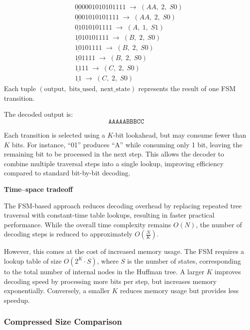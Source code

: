 \[
\begin{aligned}
&\underline{00}0001010101111 \;\rightarrow\; (AA,\;2,\;S0) \\
&\underline{00}01010101111 \;\rightarrow\; (AA,\;2,\;S0) \\
&\underline{01}010101111 \;\rightarrow\; (A,\;1,\;S1) \\
&\underline{10}10101111 \;\rightarrow\; (B,\;2,\;S0) \\
&\underline{10}101111 \;\rightarrow\; (B,\;2,\;S0) \\
&\underline{10}1111 \;\rightarrow\; (B,\;2,\;S0) \\
&\underline{11}11 \;\rightarrow\; (C,\;2,\;S0) \\
&\underline{11} \;\rightarrow\; (C,\;2,\;S0)
\end{aligned}
\]
\noindent Each tuple $(\text{output},\;\text{bits\_used},\;\text{next\_state})$ represents the result of one FSM transition.

\noindent The decoded output is:
\[
\texttt{AAAAABBBCC}
\]


\noindent Each transition is selected using a $K$-bit lookahead, but may consume fewer than $K$ bits. For instance, ``01'' produces ``A'' while consuming only 1 bit, leaving the remaining bit to be processed in the next step. This allows the decoder to combine multiple traversal steps into a single lookup, improving efficiency compared to standard bit-by-bit decoding.

\medskip
\noindent \textbf{Time--space tradeoff}

\vspace{0.3em}
\noindent The FSM-based approach reduces decoding overhead by replacing repeated tree traversal with constant-time table lookups, resulting in faster practical performance. While the overall time complexity remains $O(N)$, the number of decoding steps is reduced to approximately $O(\frac{N}{K})$.

\vspace{0.3em}
\noindent However, this comes at the cost of increased memory usage. The FSM requires a lookup table of size $O(2^K \cdot S)$, where $S$ is the number of states, corresponding to the total number of internal nodes in the Huffman tree. A larger $K$ improves decoding speed by processing more bits per step, but increases memory exponentially. Conversely, a smaller $K$ reduces memory usage but provides less speedup.


\subsubsection{Compressed Size Comparison}

